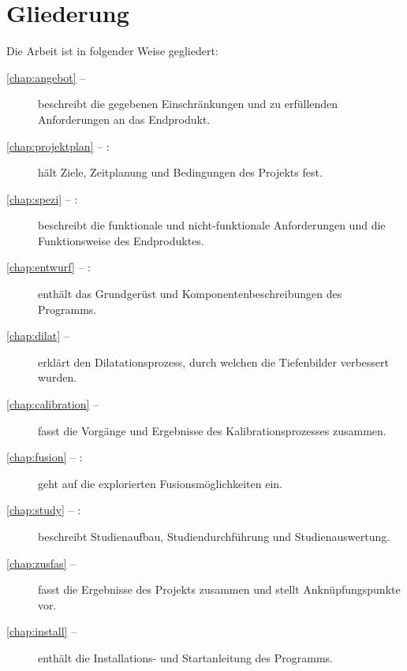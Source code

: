 \clearpage

\section*{Gliederung}
Die Arbeit ist in folgender Weise gegliedert:
\begin{description}
\item[\cref{chap:angebot} -- ] beschreibt die gegebenen Einschränkungen und zu erfüllenden Anforderungen an das Endprodukt.
\item[\cref{chap:projektplan} -- :] hält Ziele, Zeitplanung und Bedingungen des Projekts fest.
\item[\cref{chap:spezi} -- :] beschreibt die funktionale und nicht-funktionale Anforderungen und die Funktionsweise des Endproduktes.
\item[\cref{chap:entwurf} -- :] enthält das Grundgerüst und Komponentenbeschreibungen des Programms.
\item[\cref{chap:dilat} -- ] erklärt den Dilatationsprozess, durch welchen die Tiefenbilder verbessert wurden.
\item[\cref{chap:calibration} -- ] fasst die Vorgänge und Ergebnisse des Kalibrationsprozesses zusammen.
\item[\cref{chap:fusion} -- :] geht auf die explorierten Fusionsmöglichkeiten ein.
\item[\cref{chap:study} -- :] beschreibt Studienaufbau, Studiendurchführung und Studienauswertung.
\item[\cref{chap:zusfas} -- ] fasst die Ergebnisse des Projekts zusammen und stellt Anknüpfungspunkte vor.
\item[\cref{chap:install} -- ] enthält die Installations- und Startanleitung des Programms.
\end{description}

